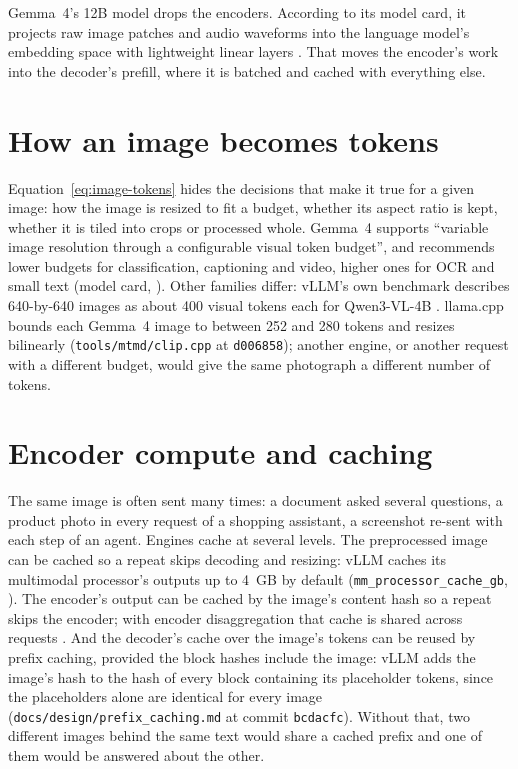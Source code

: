 Gemma~4's 12B model drops the encoders. According to its model card, it
projects raw image patches and audio waveforms into the language model's
embedding space with lightweight linear layers \cite{google2026gemma4}. That
moves the encoder's work into the decoder's prefill, where it is batched and
cached with everything else.

\section{How an image becomes tokens}

Equation~\eqref{eq:image-tokens} hides the decisions that make it true for a
given image: how the image is resized to fit a budget, whether its aspect ratio
is kept, whether it is tiled into crops or processed whole. Gemma~4 supports
``variable image resolution through a configurable visual token budget'', and
recommends lower budgets for classification, captioning and video, higher ones
for OCR and small text (model card, \cite{google2026gemma4}). Other families
differ: vLLM's own benchmark describes 640-by-640 images as about 400 visual
tokens each for Qwen3-VL-4B \cite{vllm2025epd}. llama.cpp bounds each Gemma~4
image to between 252 and 280 tokens and resizes bilinearly
(\texttt{tools/mtmd/clip.cpp} at \texttt{d006858}); another engine, or another
request with a different budget, would give the same photograph a different
number of tokens.

\section{Encoder compute and caching}

The same image is often sent many times: a document asked several questions,
a product photo in every request of a shopping assistant, a screenshot
re-sent with each step of an agent. Engines cache at several levels. The
preprocessed image can be cached so a repeat skips decoding and resizing: vLLM
caches its multimodal processor's outputs up to 4~GB by default
(\texttt{mm\_processor\_cache\_gb}, \cite{vllm2026optimization}). The
encoder's output can be cached by the image's content hash so a repeat skips the
encoder; with encoder disaggregation that cache is shared across requests
\cite{vllm2025epd}. And the decoder's cache over the image's tokens
can be reused by prefix caching, provided the block hashes include the image:
vLLM adds the image's hash to the hash of every block containing its
placeholder tokens, since the placeholders alone are identical for every image
(\texttt{docs/design/prefix\_caching.md} at commit \texttt{bcdacfc}). Without
that, two different images behind the same text would share a cached prefix and
one of them would be answered about the other.

